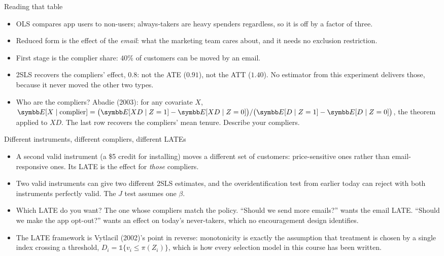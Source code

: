 \documentclass[aspectratio=169,11pt]{beamer}
\begin{document}
\begin{frame}{Reading that table}
\begin{itemize}
	\item \alert{OLS} compares app users to non-users; always-takers are heavy spenders regardless, so it is
	off by a factor of three.
	\item \alert{Reduced form} is the effect of the \emph{email}: what the marketing team cares about, and it
	needs no exclusion restriction.
	\item \alert{First stage} is the complier share: $40\%$ of customers can be moved by an email.
	\item \alert{2SLS} recovers the compliers' effect, $0.8$: not the ATE ($0.91$), not the ATT ($1.40$). No
	estimator from this experiment delivers those, because it never moved the other two types.
	\item \alert{Who are the compliers?} Abadie (2003): for any covariate $X$,
	$\E[X \mid \text{complier}] = \big(\E[X D \mid Z = 1] - \E[X D \mid Z = 0]\big)/\big(\E[D \mid Z = 1] - \E[D \mid Z = 0]\big)$,
	the theorem applied to $XD$. The last row recovers the compliers' mean tenure. Describe your compliers.
\end{itemize}
\end{frame}


\begin{frame}{Different instruments, different compliers, different LATEs}
\begin{itemize}
	\item A second valid instrument (a \$5 credit for installing) moves a different set of customers: price-sensitive
	ones rather than email-responsive ones. Its LATE is the effect for \emph{those} compliers.
	\medskip
	\item Two valid instruments can give two different 2SLS estimates, and the overidentification test from
	earlier today can reject with both instruments perfectly valid. The $J$ test assumes one $\beta$.
	\medskip
	\item Which LATE do you want? The one whose compliers match the policy. ``Should we send more emails?'' wants
	the email LATE. ``Should we make the app opt-out?'' wants an effect on today's never-takers, which no
	encouragement design identifies.
	\medskip
	\item The LATE framework is Vytlacil (2002)'s point in reverse: monotonicity is exactly the assumption that
	treatment is chosen by a single index crossing a threshold, $D_i = \mathbb{1}\{v_i \le \pi(Z_i)\}$, which is
	how every selection model in this course has been written.
\end{itemize}
\end{frame}
\end{document}
